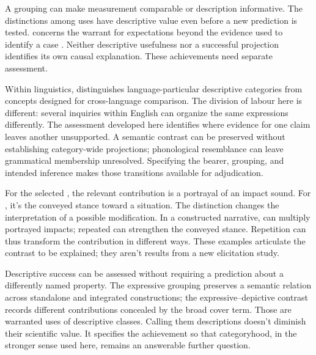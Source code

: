 A grouping can make measurement comparable or description informative.
The distinctions among  uses have descriptive value even
before a new prediction is tested.  concerns the
warrant for expectations beyond the evidence used to identify a case
\citep{Goodman1955}. Neither descriptive usefulness nor a successful
projection identifies its own causal explanation. These achievements
need separate assessment.

Within linguistics, \textcite[663, 666, 680]{haspelmath2010} distinguishes
language-particular descriptive categories from concepts designed for
cross-language comparison. The division of labour here is different:
several inquiries within English can organize the same expressions
differently. The assessment developed here identifies where evidence
for one claim leaves another unsupported. A semantic contrast can be
preserved without establishing category-wide projections; phonological
resemblance can leave grammatical membership unresolved. Specifying
the bearer, grouping, and intended inference makes those transitions
available for adjudication.

For the selected , the relevant contribution is a portrayal
of an impact sound. For , it's the conveyed stance toward
a situation. The distinction changes the interpretation of a possible
modification. In a constructed narrative,  can
multiply portrayed impacts; repeated  can strengthen the
conveyed stance. Repetition can thus transform the contribution in
different ways. These examples articulate the contrast to be explained;
they aren't results from a new elicitation study.

Descriptive success can be assessed without requiring a prediction about
a differently named property. The expressive grouping preserves a semantic relation across
standalone and integrated constructions; the expressive--depictive contrast
records different contributions concealed by the broad cover term.
Those are warranted uses of descriptive classes. Calling them descriptions
doesn't diminish their scientific value. It specifies the achievement
so that categoryhood, in the stronger sense used here, remains an
answerable further question.

